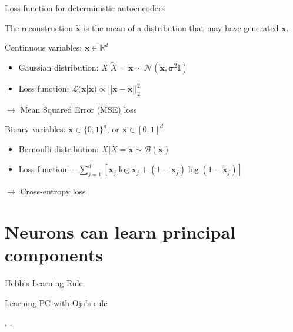 \documentclass{beamer}
\begin{document}
  \begin{frame}{Loss function for deterministic autoencoders}


    The reconstruction $\tilde{\mathbf{x}}$ is the \alert{mean} of a distribution that may have generated $\mathbf{x}$.

    \begin{block}{Continuous variables: $\mathbf{x} \in \mathbb{R}^d$}
      \begin{itemize}
        \item Gaussian distribution: $X|\tilde{X} = \tilde{\mathbf{x}} \sim \mathcal{N}(\tilde{\mathbf{x}}, \mathbf{\sigma}^2 \mathbf{I})$
      \item Loss function: $\mathcal{L}(\mathbf{x}|\tilde{\mathbf{x}}) \propto ||\mathbf{x} - \tilde{\mathbf{x}}||_2^2$      
      \end{itemize}
      $\rightarrow$ \alert{Mean Squared Error (MSE) loss}
    \end{block}

    \begin{block}{Binary variables: $\mathbf{x} \in \{0,1\}^d$, or $\mathbf{x} \in [0,1]^d$}
      \begin{itemize}
        \item Bernoulli distribution: $X|\tilde{X} = \tilde{\mathbf{x}} \sim \mathcal{B}(\tilde{\mathbf{x}})$
        \item Loss function: $-\sum_{j=1}^d [\mathbf{x}_j \log \tilde{\mathbf{x}}_j + (1-\mathbf{x}_j) \log (1-\tilde{\mathbf{x}}_j)]$
      \end{itemize}
      $\rightarrow$ \alert{Cross-entropy loss}
    \end{block}
    
  \end{frame}

  \section{Neurons can learn principal components}

  \begin{frame}{Hebb's Learning Rule}

  \end{frame}

  \begin{frame}{Learning PC with Oja's rule}

    \cite{Becker1991}, \cite{Oja1982}, \cite{Oja1992}
    
  \end{frame}
\end{document}
